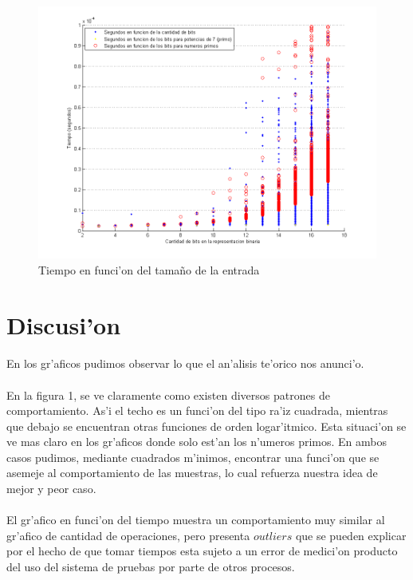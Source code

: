 \begin{figure}[H]
\centering
\includegraphics[scale=0.8]{../../codigo/ejercicio1/benchmark_de_tiempo/graficos/tamanio_Entrada_T/Tiempo_en_funcion_bits.png}
\caption{Tiempo en funci'on del tama\~{n}o de la entrada}
\label{Ej1fig6}
\end{figure}
\newpage
\section{Discusi'on}
\paragraph{}
En los gr'aficos pudimos observar lo que el an'alisis te'orico nos anunci'o.
\paragraph{}
En la figura 1, se ve claramente como existen diversos patrones de comportamiento. As'i el techo es un funci'on del tipo ra'iz 
cuadrada, mientras que debajo se encuentran otras funciones de orden logar'itmico. Esta situaci'on se ve mas claro en los 
gr'aficos donde solo est'an los n'umeros primos. En ambos casos pudimos, mediante cuadrados m'inimos, 
encontrar una funci'on que se asemeje al comportamiento de las muestras, lo cual refuerza nuestra idea de mejor y peor caso.
\paragraph{}
El gr'afico en funci'on del tiempo muestra un comportamiento muy similar al gr'afico de cantidad de operaciones, pero presenta 
$outliers$ que se pueden explicar por el hecho de que tomar tiempos esta sujeto a un error de medici'on producto del uso del sistema
de pruebas por parte de otros procesos.
